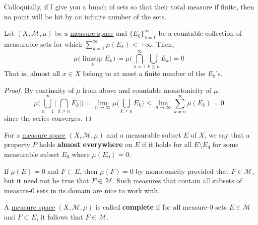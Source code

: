  Colloquially, if I give you a bunch of sets so that their total measure if finite, then no point will be hit by an infinite number of the sets. 

  \begin{lemma}
    \label{thm:borel-cantelli-lemma}
    Let $(X, \mathcal{M}, \mu)$ be a \hyperref[def:measure-space]{measure space} and $\{E_k\}_{k=1}^\infty$ be a countable collection of measurable sets for which $\sum_{k=1}^\infty \mu(E_k) < +\infty$. Then, 
    \begin{equation}
      \mu \big( \limsup_k E_k \big) \coloneqq \mu \bigg( \bigcap_{n = 1}^\infty \bigcup_{k \geq n} E_k \bigg) = 0
    \end{equation}
    That is, almost all $x \in X$ belong to at most a finite number of the $E_k$'s. 
  \end{lemma}
  \begin{proof}
    By continuity of $\mu$ from above and countable monotonicity of $\mu$, 
    \begin{equation}
      \mu \bigg( \bigcup_{n=1}^\infty \bigg[ \bigcap_{k \geq n} E_k \bigg] \bigg) = \lim_{n \to \infty} \mu \bigg( \bigcup_{k \geq n} E_k \bigg) \leq \lim_{n \to\infty} \sum_{k = n}^\infty \mu(E_k) = 0
    \end{equation}
    since the series converges. 
  \end{proof}

  \begin{definition}
		\label{def:almost_everywhere}
    For a \hyperref[def:measure-space]{measure space} $(X, \mathcal{M}, \mu)$ and a measurable subset $E$ of $X$, we say that a property $P$ holds \textbf{almost everywhere} on $E$ if it holds for all $E \setminus E_0$ for some measurable subset $E_0$ where $\mu(E_0) = 0$.
  \end{definition}

	If $\mu(E) = 0$ and $F \subset E$, then $\mu(F) = 0$ by monotonicity provided that $F \in \mathcal{M}$, but it need not be true that $F \in \mathcal{M}$. Such measures that contain all subsets of measure-$0$ sets in its domain are nice to work with. 

	\begin{definition}
	  \label{def:complete-measure}
		A \hyperref[def:measure-space]{measure space} $(X, \mathcal{M}, \mu)$ is called \textbf{complete} if for all measure-$0$ sets $E \in \mathcal{M}$ and $F \subset E$, it follows that $F \in \mathcal{M}$. 
	\end{definition}

